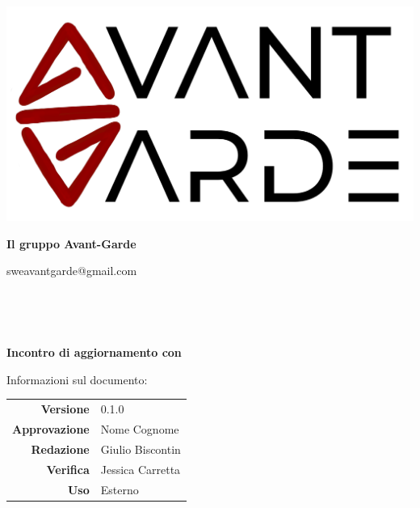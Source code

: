     \begin{titlepage}
        \begin{center}
            \includegraphics[width=\textwidth]{logo+scritta.png}

            \vspace{0.5cm}
            {\huge \textbf{Il gruppo Avant-Garde}}

            \vspace{0.4cm}
            \large{sweavantgarde@gmail.com}

            \vspace{1.5cm}
            \hrulefill\\
            \vspace{0.2cm}
            
            \textbf{\titoloDocumento}\\
            \vspace{0.5cm}

            \textbf{Incontro di aggiornamento con \textcolor{red}{\nomeAzienda}}\\
            \hrulefill

            \vfill
            Informazioni sul documento:\\
            \vspace{0.3cm}
                \begin{tabular}{ r | l }
                    \textbf{Versione} & 0.1.0\\ %
                    \textbf{Approvazione} & Nome Cognome\\ %
                    \textbf{Redazione} & Giulio Biscontin\\ %
                    \textbf{Verifica} & Jessica Carretta\\ %
                    \textbf{Uso} & Esterno\\ %
                \end{tabular}
        \end{center}
    \end{titlepage}
\restoregeometry